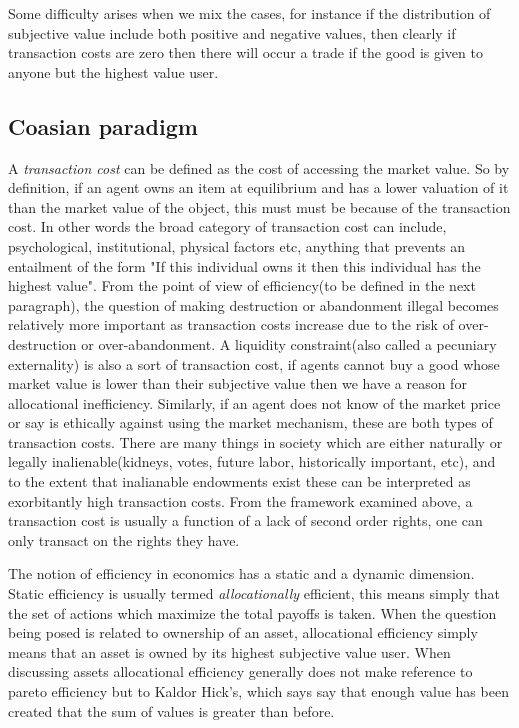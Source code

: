 \documentclass[12pt]{article}
\numberwithin{equation}{section}
\begin{document}
Some difficulty arises when we mix the cases, for instance if the distribution of subjective value include both positive and negative values, then clearly if transaction costs are zero then there will occur a trade if the good is given to anyone but the highest value user. 

\subsection{Coasian paradigm}

A \textit{transaction cost} can be defined as the cost of accessing the market value. So by definition, if an agent owns an item at equilibrium and has a lower valuation of it than the market value of the object, this must must be because of the transaction cost. In other words the broad category of transaction cost can include, psychological, institutional, physical factors etc, anything that prevents an entailment of the form "If this individual owns it then this individual has the highest value". From the point of view of efficiency(to be defined in the next paragraph), the question of making destruction or abandonment illegal becomes relatively more important as transaction costs increase due to the risk of over-destruction or over-abandonment. A liquidity constraint(also called a pecuniary externality) is also a sort of transaction cost, if agents cannot buy a good whose market value is lower than their subjective value then we have a reason for allocational inefficiency. Similarly, if an agent does not know of the market price or say is ethically against using the market mechanism, these are both types of transaction costs. There are many things in society which are either naturally or legally inalienable(kidneys, votes, future labor, historically important, etc), and to the extent that inalianable endowments exist these can be interpreted as exorbitantly high transaction costs. From the framework examined above, a transaction cost is usually a function of a lack of second order rights, one can only transact on the rights they have. 

The notion of efficiency in economics has a static and a dynamic dimension. Static efficiency is usually termed \textit{allocationally} efficient, this means simply that the set of actions which maximize the total payoffs is taken. When the question being posed is related to ownership of an asset, allocational efficiency simply means that an asset is owned by its highest subjective value user. When discussing assets allocational efficiency generally does not make reference to pareto efficiency but to Kaldor Hick's, which says say that enough value has been created that the sum of values is greater than before. 
\end{document}
